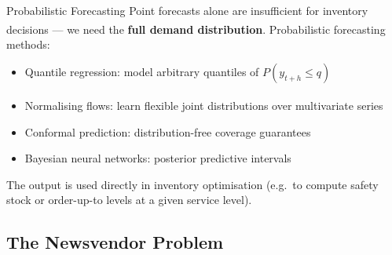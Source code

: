 \begin{v3topic}{Probabilistic Forecasting}
    Point forecasts alone are insufficient for inventory decisions --- we need the \textbf{full demand distribution}\textsuperscript{\cite[][p.~37]{wickDemandForecastingIndividual2021}}.
    Probabilistic forecasting methods:
    \begin{itemize}
        \item Quantile regression: model arbitrary quantiles of $P(y_{t+h} \le q)$
        \item Normalising flows: learn flexible joint distributions over multivariate series\textsuperscript{\cite{rasulMultivariateProbabilisticTime2021}}
        \item Conformal prediction: distribution-free coverage guarantees
        \item Bayesian neural networks: posterior predictive intervals
    \end{itemize}
    The output is used directly in inventory optimisation (e.g.\ to compute safety stock or order-up-to levels at a given service level).

\end{v3topic}

\subsection{The Newsvendor Problem}


